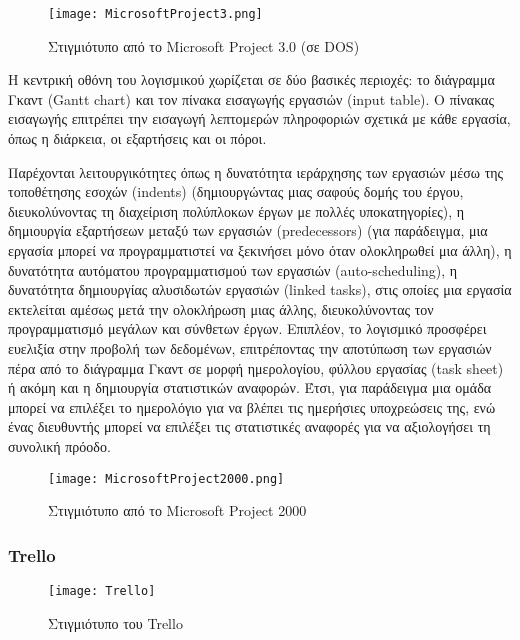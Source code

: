                 \begin{figure}[h!] \noindent \centering
                    \texttt{[image: MicrosoftProject3.png]}
                    \caption{\centering Στιγμιότυπο από το Microsoft Project 3.0 (σε DOS) \cite{WinWorld}}
                \end{figure}

                Η κεντρική οθόνη του λογισμικού χωρίζεται σε δύο βασικές περιοχές: το διάγραμμα Γκαντ (Gantt chart) και τον πίνακα εισαγωγής εργασιών (input table). Ο πίνακας εισαγωγής επιτρέπει την εισαγωγή λεπτομερών πληροφοριών σχετικά με κάθε εργασία, όπως η διάρκεια, οι εξαρτήσεις και οι πόροι.

                Παρέχονται λειτουργικότητες όπως η δυνατότητα ιεράρχησης των εργασιών μέσω της τοποθέτησης εσοχών (indents) (δημιουργώντας μιας σαφούς δομής του έργου, διευκολύνοντας τη διαχείριση πολύπλοκων έργων με πολλές υποκατηγορίες), η δημιουργία εξαρτήσεων μεταξύ των εργασιών (predecessors) (για παράδειγμα, μια εργασία μπορεί να προγραμματιστεί να ξεκινήσει μόνο όταν ολοκληρωθεί μια άλλη), η δυνατότητα αυτόματου προγραμματισμού των εργασιών (auto-scheduling), η δυνατότητα δημιουργίας αλυσιδωτών εργασιών (linked tasks), στις οποίες μια εργασία εκτελείται αμέσως μετά την ολοκλήρωση μιας άλλης, διευκολύνοντας τον προγραμματισμό μεγάλων και σύνθετων έργων. Επιπλέον, το λογισμικό προσφέρει ευελιξία στην προβολή των δεδομένων, επιτρέποντας την αποτύπωση των εργασιών πέρα από το διάγραμμα Γκαντ σε μορφή ημερολογίου, φύλλου εργασίας (task sheet) ή ακόμη και η δημιουργία στατιστικών αναφορών. Έτσι, για παράδειγμα μια ομάδα μπορεί να επιλέξει το ημερολόγιο για να βλέπει τις ημερήσιες υποχρεώσεις της, ενώ ένας διευθυντής μπορεί να επιλέξει τις στατιστικές αναφορές για να αξιολογήσει τη συνολική πρόοδο.

                \begin{figure}[h!] \noindent \centering
                    \texttt{[image: MicrosoftProject2000.png]}
                    \caption{\centering Στιγμιότυπο από το Microsoft Project 2000 \cite{WinWorld}}
                \end{figure}

            \subsubsection{Trello}
                \begin{figure}[h!] \noindent \centering
                    \texttt{[image: Trello]}
                    \caption{Στιγμιότυπο του Trello}
                \end{figure}

